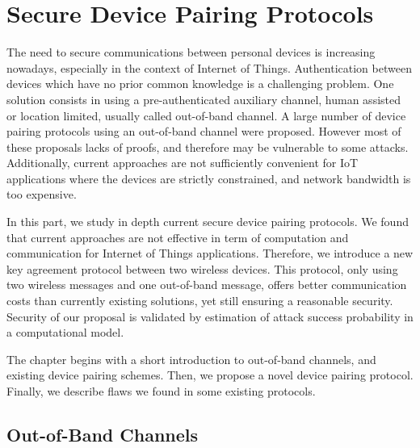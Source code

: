 
\chapter{Secure Device Pairing Protocols} %

\label{Chapter2} %



The need to secure communications between personal devices is increasing nowadays, especially in the context of Internet of Things. Authentication between devices which have no prior common knowledge is a challenging problem. One solution consists in using a pre-authenticated auxiliary channel, human assisted or location limited, usually called out-of-band channel. A large number of device pairing protocols using an out-of-band channel were proposed. However most of these proposals lacks of proofs, and therefore may be vulnerable to some attacks. Additionally, current approaches are not sufficiently convenient for IoT applications where the devices are strictly constrained, and network bandwidth is too expensive. 

In this part, we study in depth current secure device pairing protocols. We found that current approaches are not effective in term of computation and communication for Internet of Things applications. Therefore, we introduce a new key agreement protocol between two wireless devices. This protocol, only using two wireless messages and one out-of-band message, offers better communication costs than currently existing solutions, yet still ensuring a reasonable security. Security of our proposal is validated by estimation of attack success probability in a computational model.  

The chapter begins with a short introduction to out-of-band channels, and existing device pairing schemes. Then, we propose a novel device pairing protocol.  Finally, we describe flaws we found in some existing protocols. 

\section{Out-of-Band Channels}

